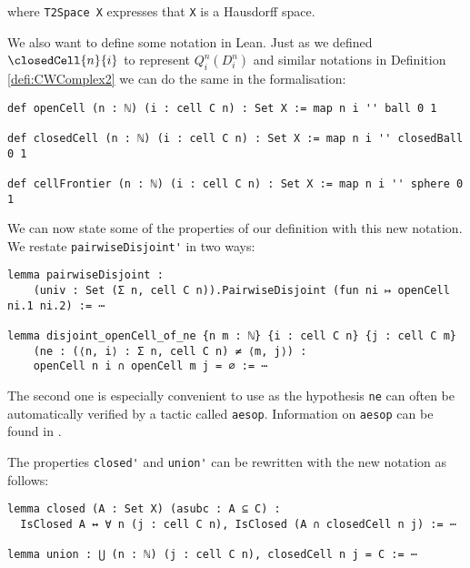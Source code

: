 where \lstinline{T2Space X}
\href{https://github.com/leanprover-community/mathlib4/blob/ed125a4216d18273cb1b96d4c846d32b85d74faf/Mathlib/Topology/Separation.lean#L1291-L1297}{\faExternalLink}
expresses that \lstinline{X} is a Hausdorff space.

We also want to define some notation in Lean.
Just as we defined $\closedCell{n}{i}$ to represent $Q^n_i(D_i^n)$ and similar notations in Definition \ref{defi:CWComplex2} we can do the same in the formalisation: 
\href{https://github.com/scholzhannah/CWComplexes/blob/7be4872a05b534011cc969eb5b80a4b7f0bf57e2/CWcomplexes/Definition.lean#L84-L94}{\faExternalLink}

\begin{lstlisting}
def openCell (n : ℕ) (i : cell C n) : Set X := map n i '' ball 0 1

def closedCell (n : ℕ) (i : cell C n) : Set X := map n i '' closedBall 0 1

def cellFrontier (n : ℕ) (i : cell C n) : Set X := map n i '' sphere 0 1
\end{lstlisting}

We can now state some of the properties of our definition with this new notation.
We restate \lstinline{pairwiseDisjoint'} in two ways:
\href{https://github.com/scholzhannah/CWComplexes/blob/7be4872a05b534011cc969eb5b80a4b7f0bf57e2/CWcomplexes/Definition.lean#L96-L103}{\faExternalLink}

\begin{lstlisting}
lemma pairwiseDisjoint :
    (univ : Set (Σ n, cell C n)).PairwiseDisjoint (fun ni ↦ openCell ni.1 ni.2) := ⋯

lemma disjoint_openCell_of_ne {n m : ℕ} {i : cell C n} {j : cell C m}
    (ne : (⟨n, i⟩ : Σ n, cell C n) ≠ ⟨m, j⟩) :
    openCell n i ∩ openCell m j = ∅ := ⋯
\end{lstlisting}

The second one is especially convenient to use as the hypothesis \lstinline{ne} can often be automatically verified by a tactic called \lstinline{aesop}.
Information on \lstinline{aesop} can be found in \cite{Limperg2023}.

The properties \lstinline{closed'} and \lstinline{union'} can be rewritten with the new notation as follows:
\href{https://github.com/scholzhannah/CWComplexes/blob/7be4872a05b534011cc969eb5b80a4b7f0bf57e2/CWcomplexes/Definition.lean#L112-L116}{\faExternalLink}

\begin{lstlisting}
lemma closed (A : Set X) (asubc : A ⊆ C) :
  IsClosed A ↔ ∀ n (j : cell C n), IsClosed (A ∩ closedCell n j) := ⋯

lemma union : ⋃ (n : ℕ) (j : cell C n), closedCell n j = C := ⋯
\end{lstlisting}

